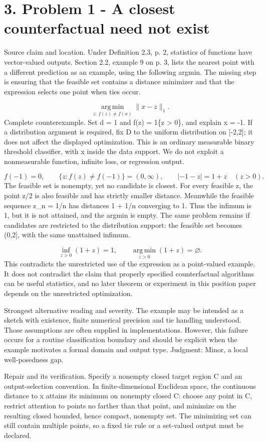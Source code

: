 \documentclass[10pt]{article}
\begin{document}
\section*{3. Problem 1 - A closest counterfactual need not exist}
Source claim and location. Under Definition 2.3, p. 2, statistics of functions have vector-valued outputs. Section 2.2, example 9 on p. 3, lists the nearest point with a different prediction as an example, using the following argmin. The missing step is ensuring that the feasible set contains a distance minimizer and that the expression selects one point when ties occur.\par
\[\operatorname*{arg\,min}_{z:\,f(z)\ne f(x)}\|x-z\|_1.\] Complete counterexample. Set d = 1 and f(z) = 1\{z > 0\}, and explain x = -1. If a distribution argument is required, fix D to the uniform distribution on [-2,2]; it does not affect the displayed optimization. This is an ordinary measurable binary threshold classifier, with x inside the data support. We do not exploit a nonmeasurable function, infinite loss, or regression output.\par
\[f(-1)=0,\qquad \{z:f(z)\ne f(-1)\}=(0,\infty),\qquad |-1-z|=1+z\quad(z>0).\] The feasible set is nonempty, yet no candidate is closest. For every feasible z, the point z/2 is also feasible and has strictly smaller distance. Meanwhile the feasible sequence z\_n = 1/n has distances 1 + 1/n converging to 1. Thus the infimum is 1, but it is not attained, and the argmin is empty. The same problem remains if candidates are restricted to the distribution support: the feasible set becomes (0,2], with the same unattained infimum.\par
\[\inf_{z>0}(1+z)=1,\qquad \operatorname*{arg\,min}_{z>0}(1+z)=\varnothing.\] This contradicts the unrestricted use of the expression as a point-valued example. It does not contradict the claim that properly specified counterfactual algorithms can be useful statistics, and no later theorem or experiment in this position paper depends on the unrestricted optimization.\par
Strongest alternative reading and severity. The example may be intended as a sketch with existence, finite numerical precision and tie handling understood. Those assumptions are often supplied in implementations. However, this failure occurs for a routine classification boundary and should be explicit when the example motivates a formal domain and output type. Judgment: Minor, a local well-posedness gap.\par
Repair and its verification. Specify a nonempty closed target region C and an output-selection convention. In finite-dimensional Euclidean space, the continuous distance to x attains its minimum on nonempty closed C: choose any point in C, restrict attention to points no farther than that point, and minimize on the resulting closed bounded, hence compact, nonempty set. The minimizing set can still contain multiple points, so a fixed tie rule or a set-valued output must be declared.\par
\end{document}
